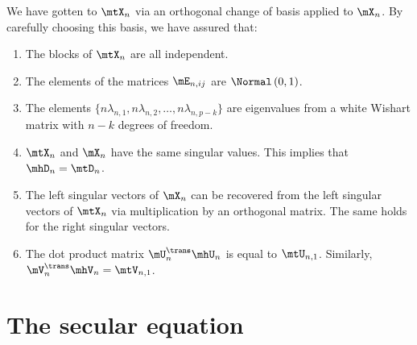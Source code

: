 We have gotten to $\mtX_n$ via an orthogonal change of basis applied to $\mX_n$.  By carefully choosing this basis, we have assured that:
\begin{enumerate}
    \item The blocks of $\mtX_n$ are all independent.
    \item The elements of the matrices $\mE_{n,ij}$ are 
        \iid $\Normal\left( 0, 1 \right)$.
    \item The elements 
        $\{ n \lambda_{n,1}, n \lambda_{n,2}, \ldots, 
            n \lambda_{n,p-k} \}$ are eigenvalues from
        a white Wishart matrix with $n-k$ degrees of freedom.
    \item $\mtX_n$ and $\mX_n$ have the same singular values.  This implies
        that $\mhD_n = \mtD_n$.
    \item The left singular vectors of $\mX_n$ can be recovered from the
        left singular vectors of $\mtX_n$ via multiplication by an orthogonal
        matrix.  The same holds for the right singular vectors.
    \item The dot product matrix $\mU_n^\trans \mhU_n$ is equal to
        $\mtU_{n,1}$.
        Similarly, $\mV_n^\trans \mhV_n = \mtV_{n,1}$.
\end{enumerate}

\section{The secular equation}\label{S:secular-equation}

